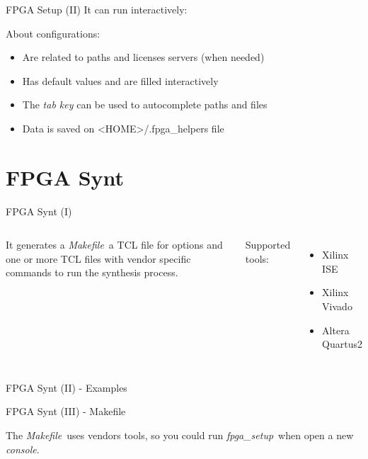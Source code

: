 \documentclass{beamer}
\newcommand{\fpgasetup}      {\textit{fpga\_setup}}
\newcommand{\console}        {\textit{console}}
\newcommand{\makefile}       {\textit{Makefile}}
\begin{document}
\begin{frame}[fragile]{FPGA Setup (II)}
  It can run interactively:
  \scriptsize
  
  \normalsize
  About configurations:
  \begin{itemize}
    \item Are related to paths and licenses servers (when needed)
    \item Has default values and are filled interactively
    \item The \textit{tab key} can be used to autocomplete paths and files
    \item Data is saved on <HOME>/.fpga\_helpers file
  \end{itemize}
\end{frame}


\section{FPGA Synt}

\begin{frame}[fragile]{FPGA Synt (I)}
  \begin{columns}
      \begin{block}{}
        \small
        It generates a \makefile\ a TCL file for options and one or more TCL files
        with vendor specific commands to run the synthesis process.
      \end{block}{}
      \small Supported tools:
      \begin{itemize}
        \tiny
        \item Xilinx ISE
        \item Xilinx Vivado
        \item Altera Quartus2
      \end{itemize}
  \end{columns}
  \scriptsize
  
\end{frame}

\begin{frame}[fragile]{FPGA Synt (II) - Examples}
  \small
  
  
\end{frame}

\begin{frame}[fragile]{FPGA Synt (III) - Makefile}
  \tiny
  
  \begin{alertblock}{}
    \small
    The \makefile\ uses vendors tools, so you could run \fpgasetup\ when open
    a new \console.
  \end{alertblock}
\end{frame}
\end{document}
